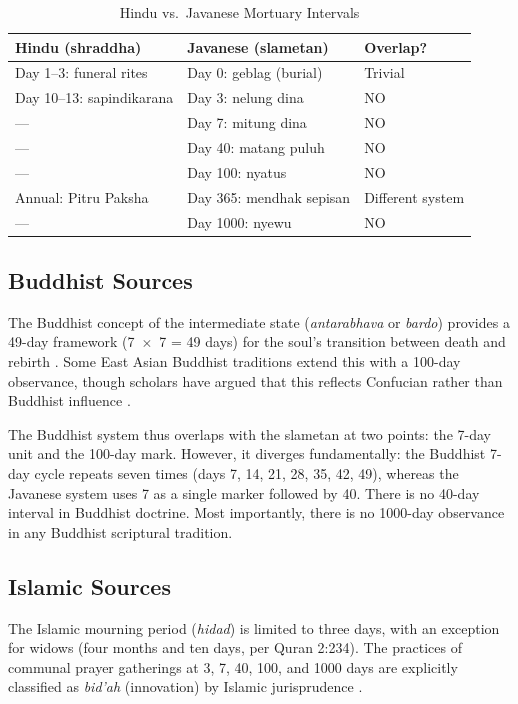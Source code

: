 \documentclass[12pt,a4paper]{article}
\begin{document}
\begin{table}[H]
\centering
\caption{Hindu vs.\ Javanese Mortuary Intervals}
\label{tab:hindu_javanese}
\begin{tabular}{lll}
\toprule
\textbf{Hindu (shraddha)} & \textbf{Javanese (slametan)} & \textbf{Overlap?} \\
\midrule
Day 1--3: funeral rites & Day 0: geblag (burial) & Trivial \\
Day 10--13: sapindikarana & Day 3: nelung dina & NO \\
--- & Day 7: mitung dina & NO \\
--- & Day 40: matang puluh & NO \\
--- & Day 100: nyatus & NO \\
Annual: Pitru Paksha & Day 365: mendhak sepisan & Different system \\
--- & Day 1000: nyewu & NO \\
\bottomrule
\end{tabular}
\end{table}

\subsection{Buddhist Sources}

The Buddhist concept of the intermediate state (\textit{antarabhava} or \textit{bardo}) provides a 49-day framework (7~$\times$~7 = 49 days) for the soul's transition between death and rebirth \citep{cuevas_2003}. Some East Asian Buddhist traditions extend this with a 100-day observance, though scholars have argued that this reflects Confucian rather than Buddhist influence \citep{teiser_1988}.

The Buddhist system thus overlaps with the slametan at two points: the 7-day unit and the 100-day mark. However, it diverges fundamentally: the Buddhist 7-day cycle repeats seven times (days 7, 14, 21, 28, 35, 42, 49), whereas the Javanese system uses 7 as a single marker followed by 40. There is no 40-day interval in Buddhist doctrine. Most importantly, there is no 1000-day observance in any Buddhist scriptural tradition.

\subsection{Islamic Sources}

The Islamic mourning period (\textit{hidad}) is limited to three days, with an exception for widows (four months and ten days, per Quran 2:234). The practices of communal prayer gatherings at 3, 7, 40, 100, and 1000 days are explicitly classified as \textit{bid'ah} (innovation) by Islamic jurisprudence \citep[155--157]{woodward_1989}.
\end{document}

